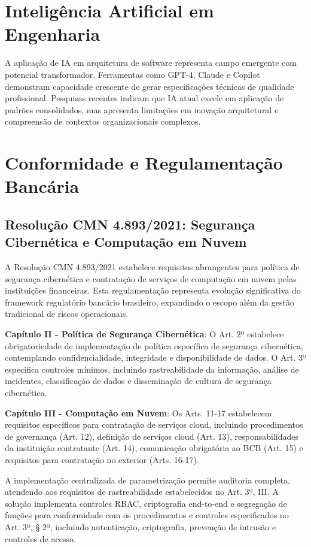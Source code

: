 \section{Inteligência Artificial em Engenharia}

A aplicação de IA em arquitetura de software representa campo emergente com potencial transformador. Ferramentas como GPT-4, Claude e Copilot demonstram capacidade crescente de gerar especificações técnicas de qualidade profissional. Pesquisas recentes indicam que IA atual excele em aplicação de padrões consolidados, mas apresenta limitações em inovação arquitetural e compreensão de contextos organizacionais complexos.

\section{Conformidade e Regulamentação Bancária}

\subsection{Resolução CMN 4.893/2021: Segurança Cibernética e Computação em Nuvem}

A Resolução CMN 4.893/2021 estabelece requisitos abrangentes para política de segurança cibernética e contratação de serviços de computação em nuvem pelas instituições financeiras. Esta regulamentação representa evolução significativa do framework regulatório bancário brasileiro, expandindo o escopo além da gestão tradicional de riscos operacionais.

\textbf{Capítulo II - Política de Segurança Cibernética}: O Art. 2º estabelece obrigatoriedade de implementação de política específica de segurança cibernética, contemplando confidencialidade, integridade e disponibilidade de dados. O Art. 3º especifica controles mínimos, incluindo rastreabilidade da informação, análise de incidentes, classificação de dados e disseminação de cultura de segurança cibernética.

\textbf{Capítulo III - Computação em Nuvem}: Os Arts. 11-17 estabelecem requisitos específicos para contratação de serviços cloud, incluindo procedimentos de governança (Art. 12), definição de serviços cloud (Art. 13), responsabilidades da instituição contratante (Art. 14), comunicação obrigatória ao BCB (Art. 15) e requisitos para contratação no exterior (Arts. 16-17).

A implementação centralizada de parametrização permite auditoria completa, atendendo aos requisitos de rastreabilidade estabelecidos no Art. 3º, III. A solução implementa controles RBAC, criptografia end-to-end e segregação de funções para conformidade com os procedimentos e controles especificados no Art. 3º, § 2º, incluindo autenticação, criptografia, prevenção de intrusão e controles de acesso.

